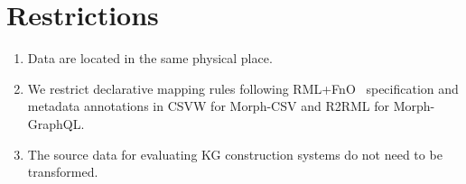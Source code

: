 \section{Restrictions}

\begin{enumerate}[label=\textbf{R{\arabic*}}]
    \item Data are located in the same physical place.
    \item We restrict declarative mapping rules following RML+FnO~\citep{de2017declarative} specification and metadata annotations in CSVW for Morph-CSV and R2RML for Morph-GraphQL.
    \item The source data for evaluating KG construction systems do not need to be transformed.
\end{enumerate}
